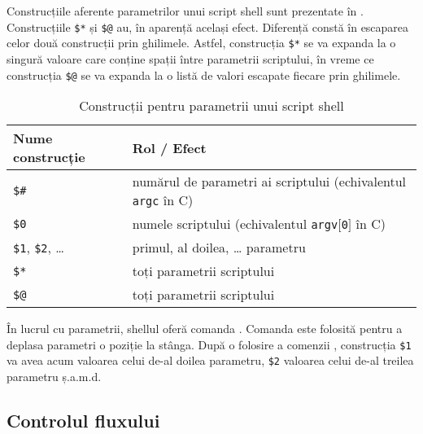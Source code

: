 Construcțiile aferente parametrilor unui script shell sunt prezentate în .
Construcțiile \texttt{\$*} și \texttt{\$@} au, în aparență același efect.
Diferență constă în escaparea celor două construcții prin ghilimele.
Astfel, construcția \texttt{\$*} se va expanda la o singură valoare care conține spații între parametrii scriptului, în vreme ce construcția \texttt{\$@} se va expanda la o listă de valori escapate fiecare prin ghilimele.

\begin{table}[!htb]
  \begin{center}
    \begin{tabular}{ p{} p{} }
      \toprule
        \textbf{Nume construcție} &
        \textbf{Rol / Efect} \\
      \midrule
        \texttt{\$\#} &
        numărul de parametri ai scriptului (echivalentul \texttt{argc} în C) \\

        \texttt{\$0} &
        numele scriptului (echivalentul \texttt{argv$[$0$]$} în C) \\

        \texttt{\$1}, \texttt{\$2}, \ldots &
        primul, al doilea, \ldots{} parametru\\

        \texttt{\$*} &
        toți parametrii scriptului\\

        \texttt{\$@} &
        toți parametrii scriptului \\

      \bottomrule
    \end{tabular}
  \end{center}
  \caption{Construcții pentru parametrii unui script shell}
  \label{tab:auto:script-params}
\end{table}

În lucrul cu parametrii, shellul oferă comanda .
Comanda  este folosită pentru a deplasa parametri o poziție la stânga.
După o folosire a comenzii , construcția \texttt{\$1} va avea acum valoarea celui de-al doilea parametru, \texttt{\$2} valoarea celui de-al treilea parametru ș.a.m.d.

\subsection{Controlul fluxului}
\label{sec:auto:script-func:flow-control}

